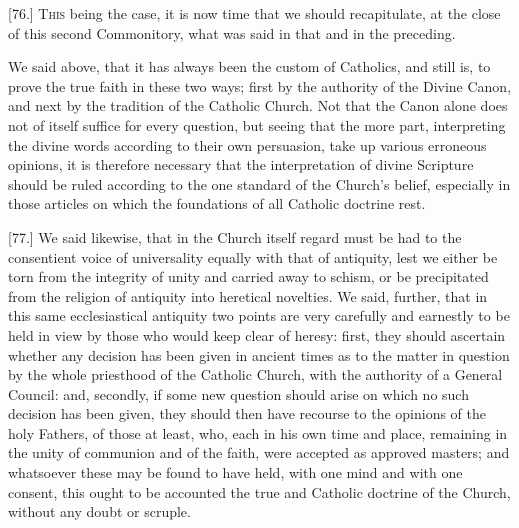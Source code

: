 [76.] \textsc{This} being the case, it is now time that we should recapitulate, at the close of this second Commonitory, what was said in that and in the preceding.

We said above, that it has always been the custom of Catholics, and still is, to prove the true faith in these two ways; first by the authority of the Divine Canon, and next by the tradition of the Catholic Church. Not that the Canon alone does not of itself suffice for every question, but seeing that the more part, interpreting the divine words according to their own persuasion, take up various erroneous opinions, it is therefore necessary that the interpretation of divine Scripture should be ruled according to the one standard of the Church’s belief, especially in those articles on which the foundations of all Catholic doctrine rest.

[77.] We said likewise, that in the Church itself regard must be had to the consentient voice of universality equally with that of antiquity, lest we either be torn from the integrity of unity and carried away to schism, or be precipitated from the religion of antiquity into heretical novelties. We said, further, that in this same ecclesiastical antiquity two points are very carefully and earnestly to be held in view by those who would keep clear of heresy: first, they should ascertain whether any decision has been given in ancient times as to the matter in question by the whole priesthood of the Catholic Church, with the authority of a General Council: and, secondly, if some new question should arise on which no such decision has been given, they should then have recourse to the opinions of the holy Fathers, of those at least, who, each in his own time and place, remaining in the unity of communion and of the faith, were accepted as approved masters; and whatsoever these may be found to have held, with one mind and with one consent, this ought to be accounted the true and Catholic doctrine of the Church, without any doubt or scruple.

